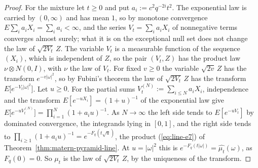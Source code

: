 \begin{proof}
For the mixture let $t \ge 0$ and put $a_i := c^2q^{-2i}t^2$. The exponential law is carried by
$(0, \infty)$ and has mean $1$, so by monotone convergence $E\sum_ia_iX_i = \sum_ia_i < \infty$, and
the series $V_t = \sum_ia_iX_i$ of nonnegative terms converges almost surely; what it is on the
exceptional null set does not change the law of $\sqrt{2V_t}\,Z$. The variable $V_t$ is a
measurable function of the sequence $(X_i)$, which is independent of $Z$, so the pair $(V_t, Z)$ has
the product law $\nu \otimes N(0, I)$, with $\nu$ the law of $V_t$. For fixed $v \ge 0$ the variable
$\sqrt{2v}\,Z$ has the transform $e^{-v|\omega|^2}$, so by Fubini's theorem the law of
$\sqrt{2V_t}\,Z$ has the transform $E\bigl[e^{-V_t|\omega|^2}\bigr]$. Let $u \ge 0$. For the
partial sums $V_t^{(N)} := \sum_{i \le N}a_iX_i$, independence and the transform
$E[e^{-uX_i}] = (1 + u)^{-1}$ of the exponential law give
$E\bigl[e^{-uV_t^{(N)}}\bigr] = \prod_{i=1}^N(1 + a_iu)^{-1}$. As $N \to \infty$ the left side tends
to $E[e^{-uV_t}]$ by dominated convergence, the integrands lying in $[0, 1]$, and the right side
tends to $\prod_{i \ge 1}(1 + a_iu)^{-1} = e^{-F_q(t\sqrt u)}$, the product (\ref{eq:line-e7}) of
Theorem~\ref{thm:matern-pyramid-line}. At $u = |\omega|^2$ this is
$e^{-F_q(t|\omega|)} = \widehat{\mu_t}(\omega)$, as $F_q(0) = 0$. So $\mu_t$ is the law of
$\sqrt{2V_t}\,Z$, by the uniqueness of the transform.


\end{proof}

